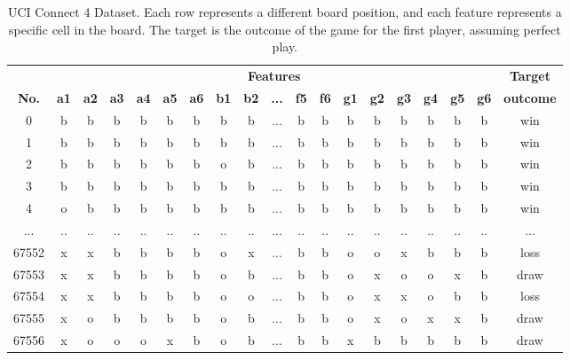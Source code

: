 \documentclass{article}
\begin{document}
\begin{table}[h!]
\small
\centering
\renewcommand{\arraystretch}{1.2}
{
\begin{tabular}{ c | c c c c c c c c c c c c c c c c c | c }
\rowcolor{header}
 & \multicolumn{17}{c|}{\textbf{Features}} &  \textbf{Target} \\ \rowcolor{header}
\textbf{No.} & \textbf{a1} & \textbf{a2} & \textbf{a3} & \textbf{a4} & \textbf{a5} &
    \textbf{a6} & \textbf{b1} & \textbf{b2} & \textbf{...} & \textbf{f5} & \textbf{f6} &
    \textbf{g1} & \textbf{g2} & \textbf{g3} & \textbf{g4} & \textbf{g5} & \textbf{g6} & \textbf{outcome} \\ 
0      &  b &  b &  b &  b &  b &  b &  b &  b & ... &  b &  b &  b &  b &  b &  b &  b &  b &     win \\
1      &  b &  b &  b &  b &  b &  b &  b &  b & ... &  b &  b &  b &  b &  b &  b &  b &  b &     win \\
2      &  b &  b &  b &  b &  b &  b &  o &  b & ... &  b &  b &  b &  b &  b &  b &  b &  b &     win \\
3      &  b &  b &  b &  b &  b &  b &  b &  b & ... &  b &  b &  b &  b &  b &  b &  b &  b &     win \\
4      &  o &  b &  b &  b &  b &  b &  b &  b & ... &  b &  b &  b &  b &  b &  b &  b &  b &     win \\
...    & .. & .. & .. & .. & .. & .. & .. & .. & ... & .. & .. & .. & .. & .. & .. & .. & .. &     ... \\
67552  &  x &  x &  b &  b &  b &  b &  o &  x & ... &  b &  b &  o &  o &  x &  b &  b &  b &    loss \\
67553  &  x &  x &  b &  b &  b &  b &  o &  b & ... &  b &  b &  o &  x &  o &  o &  x &  b &    draw \\
67554  &  x &  x &  b &  b &  b &  b &  o &  o & ... &  b &  b &  o &  x &  x &  o &  b &  b &    loss \\
67555  &  x &  o &  b &  b &  b &  b &  o &  b & ... &  b &  b &  o &  x &  o &  x &  x &  b &    draw \\
67556  &  x &  o &  o &  o &  x &  b &  o &  b & ... &  b &  b &  x &  b &  b &  b &  b &  b &    draw \\
\end{tabular}
}
\caption{UCI Connect 4 Dataset. Each row represents a different board position, and each feature
         represents a specific cell in the board. The target is the outcome of the game for the
         first player, assuming perfect play.}
\label{table:uci-dataset}
\end{table}
\end{document}
